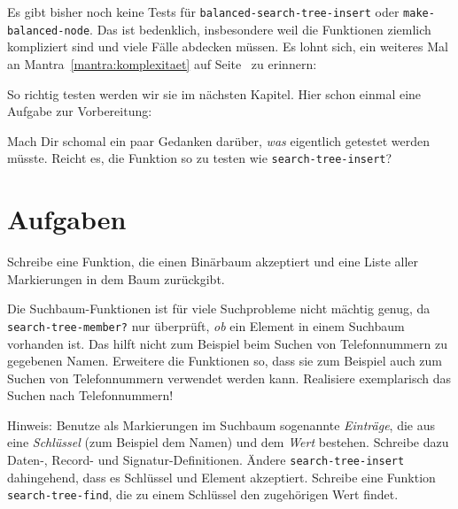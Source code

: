 Es gibt bisher noch keine Tests für
\lstinline{balanced-search-tree-insert} oder
\lstinline{make-balanced-node}.  Das ist bedenklich, insbesondere weil
die Funktionen ziemlich kompliziert sind und viele Fälle abdecken
müssen.  Es lohnt sich, ein weiteres Mal an
Mantra~\ref{mantra:komplexitaet} auf
Seite~\pageref{mantra:komplexitaet} zu erinnern:

\mantrakomplexitaet*

So richtig testen werden wir sie im nächsten Kapitel.  Hier schon
einmal eine Aufgabe zur Vorbereitung:
  
\begin{aufgabeinline}
  Mach Dir schomal ein paar Gedanken darüber, \emph{was} eigentlich
  getestet werden müsste.  Reicht es, die Funktion so zu testen wie
  \lstinline{search-tree-insert}?
\end{aufgabeinline}

\section*{Aufgaben}

\begin{aufgabe}
  Schreibe eine Funktion, die einen Binärbaum akzeptiert
  und eine Liste aller Markierungen in dem Baum zurückgibt.
\end{aufgabe}


\begin{aufgabe}
  Die Suchbaum-Funktionen ist für viele Suchprobleme nicht
  mächtig genug, da \texttt{search-tree-member?} nur überprüft,
  \emph{ob} ein Element in einem Suchbaum vorhanden ist.  Das hilft
  nicht zum Beispiel beim Suchen von Telefonnummern zu gegebenen Namen.
  Erweitere die Funktionen so, dass sie zum Beispiel auch zum Suchen
  von Telefonnummern verwendet werden kann.  Realisiere 
  exemplarisch das Suchen nach Telefonnummern!

  Hinweis: Benutze als Markierungen im Suchbaum sogenannte
  \textit{Einträge}, die aus eine \textit{Schlüssel} (zum Beispiel dem Namen)
  und dem \textit{Wert} bestehen.  Schreibe dazu Daten-,
  Record- und Signatur-Definitionen. Ändere \texttt{search-tree-insert}
  dahingehend, dass es Schlüssel und Element akzeptiert.  Schreibe eine
  Funktion \texttt{search-tree-find}, die zu einem Schlüssel den
  zugehörigen Wert findet.
\end{aufgabe}

